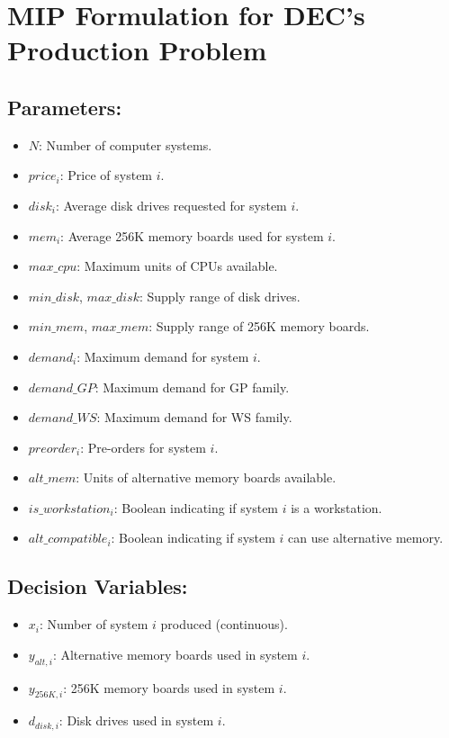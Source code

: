 \documentclass{article}
\begin{document}
\section*{MIP Formulation for DEC's Production Problem}

\subsection*{Parameters:}

\begin{itemize}
    \item $N$: Number of computer systems.
    \item $price_i$: Price of system $i$.
    \item $disk_i$: Average disk drives requested for system $i$.
    \item $mem_i$: Average 256K memory boards used for system $i$.
    \item $max\_cpu$: Maximum units of CPUs available.
    \item $min\_disk$, $max\_disk$: Supply range of disk drives.
    \item $min\_mem$, $max\_mem$: Supply range of 256K memory boards.
    \item $demand_i$: Maximum demand for system $i$.
    \item $demand\_GP$: Maximum demand for GP family.
    \item $demand\_WS$: Maximum demand for WS family.
    \item $preorder_i$: Pre-orders for system $i$.
    \item $alt\_mem$: Units of alternative memory boards available.
    \item $is\_workstation_i$: Boolean indicating if system $i$ is a workstation.
    \item $alt\_compatible_i$: Boolean indicating if system $i$ can use alternative memory.
\end{itemize}

\subsection*{Decision Variables:}

\begin{itemize}
    \item $x_i$: Number of system $i$ produced (continuous).
    \item $y_{alt,i}$: Alternative memory boards used in system $i$.
    \item $y_{256K,i}$: 256K memory boards used in system $i$.
    \item $d_{disk,i}$: Disk drives used in system $i$.
\end{itemize}
\end{document}
